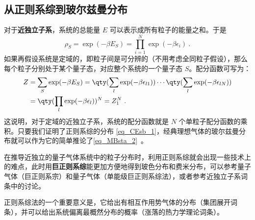 \subsection{从正则系综到玻尔兹曼分布}
对于\textbf{近独立子系}，系统的总能量 $E$ 可以表示成所有粒子的能量之和。于是
\begin{equation}
\rho_S=\exp(-\beta E_S)=\prod_{i=1}^N\exp(-\beta\epsilon_i)~.
\end{equation}
如果再假设系统是定域的，即粒子间是可分辨的（不用考虑全同粒子假设），那么每个粒子分别处于某个量子态，对应整个系统的一个量子态 $S$。配分函数可写为：
\begin{equation}
\begin{aligned}
Z&=\sum_S\exp(-\beta E_S)=\qty(\sum_{l}\exp(-\beta\epsilon_{l1}))\cdots\qty(\sum_{l}\exp(-\beta\epsilon_{lN}))\\
&=\qty(\prod_{l}\exp(-\beta\epsilon_{l}))^N=Z_1^N~.
\end{aligned}
\end{equation}
这说明，对于定域的近独立子系，系统的配分函数就是 $N$ 个单粒子配分函数的乘积。只要我们证明了正则系综的分布 \autoref{eq_CEsb_1}，经典理想气体的玻尔兹曼分布就可以作为它的简单推论了\autoref{eq_MBsta_2}~。

在推导近独立的量子气体系统中的粒子分布时，利用正则系综就会出现一些技术上的难点，此时用\textbf{巨正则系综}能更加方便地得到玻色分布和费米分布，可以参考量子气体（巨正则系宗）和量子气体（单能级巨正则系综法），或者参考近独立子系词条中的讨论。

正则系综法的一个重要意义是，它给出有相互作用势气体的分布（集团展开词条），并可以给出系统偏离最概然分布的概率（涨落的热力学理论词条）。
